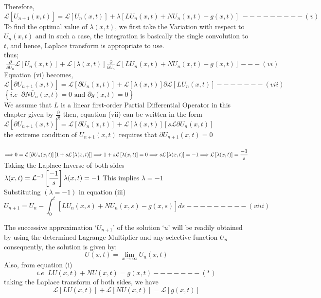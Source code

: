 \documentclass[a4paper 11pt]{article}
\newcommand{\Laplace}{\mathcal{L}}
\newcommand{\sbracket}[1]{\left[#1\right]}
\newcommand{\Un}[2]{U_{#1}(#2)}
\newcommand{\NI}{\noindent}
\newcommand{\InverseL}[1]{\Laplace^{-1}\left[#1\right]}
\newcommand{\LT}[1]{\Laplace \left[#1\right]}
\begin{document}
\NI Therefore, 
$$
\LT{\Un{n+1}{x,t}} = \LT{\Un{n}{x,t}} + \lambda \sbracket{L\Un{n}{x,t} + N\Un{n}{x,t} - g(x,t)} \; - - - - - - - - - (v)
$$
To find the optimal value of $\lambda(x,t)$, we first take the Variation with respect to $\Un{n}{x,t}$ and in such a case, the integration is basically the single convolution to $t$, and hence, Laplace transform  is appropriate to use. \\[0.2cm]

\NI thus;\\
$\; \displaystyle
\frac{\partial}{\partial U_n}\LT{\Un{n}{x,t}} + \LT{\lambda(x,t)}\frac{\partial}{\partial U_n}\LT{L\Un{n}{x,t} + N\Un{n}{x,t} - g(x,t)} - - - (vi)
$\\[0.3cm]
Equation (vi) becomes,\\[0.2cm]
$\displaystyle
\LT{\partial\Un{n+1}{x,t}} = \LT{\partial U_n(x,t)} + \LT{\lambda (x,t)}\partial \LT{L\Un{n}{x,t}} - - - - - - - (vii)
$\\[0.3cm]
$\displaystyle
\left\{ i.e \; \; \partial N\bar{U}_{n}(x,t) = 0 \text{ and } \partial g(x,t) = 0\right\}
$\\[0.2cm]

\NI We assume that $L$ is a linear first-order Partial Differential Operator in this chapter given by $\displaystyle \frac{\partial}{\partial t}$ then, equation (vii) can be written in the form\\[0.2cm]
$\displaystyle
\LT{\partial\Un{n+1}{x,t}} = \LT{\partial\Un{n}{x,t}} + \LT{\lambda(x,t)}\sbracket{s\Laplace \partial\Un{n}{x,t}}
$\\[0.2cm]
the extreme condition of $\Un{n+1}{x,t}$ requires that $\partial\Un{n+1}{x,t} = 0$\\[0.2cm]\
$\displaystyle
\Longrightarrow 0 = \LT{\partial\Un{n}{x,t}}\left[1 + s\LT{\lambda(x,t)}\right] \\[0.2cm]
\Longrightarrow 1 + s\LT{\lambda(x,t)} = 0 \\[0.2cm]
\Longrightarrow s\LT{\lambda(x,t)} = - 1 \\[0.2cm]
\Longrightarrow \LT{\lambda(x,t)} = \frac{-1}{s}
$\\[0.2cm]

\NI Taking the Laplace Inverse of both sides\\[0.2cm]
$\displaystyle
\lambda(x,t) = \InverseL{\frac{-1}{s}} \\[0.2cm]
\lambda(x,t) = - 1  \\[0.2cm]
$
This implies $\lambda = -1$\\[0.3cm]

\NI Substituting $(\lambda = -1)$ in equation (iii)\\[0.2cm]
$$
U_{n+1} = U_n - \int_{0}^{t} \sbracket{L\Un{n}{x,s} + N\bar{U}_{n}(x,s) - g(x,s)}ds - - - - - - - - - (viii)
$$

\NI The successive approximation `$U_{n+1}$' of the solution `$u$' will be readily obtained by using the determined Lagrange Multiplier and any selective function $U_n$ consequently, the solution is given by: 
$$
\Un{}{x,t} = \lim\limits_{x \rightarrow \infty}\Un{n}{x,t}
$$
\newpage
Also, from equation (i)
$$
i.e\; \;  LU(x,t) + NU(x,t) = g(x,t) - - - - - - - (*)
$$
taking the Laplace transform of both sides, we have
$$
\LT{LU(x,t)} + \LT{NU(x,t)} = \LT{g(x,t)}
$$
\end{document}

